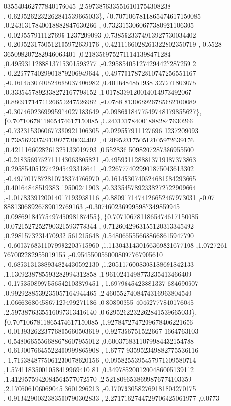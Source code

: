 \begin{DoxyCode}
      035540462777840176045 ,2.5973876335516101754308238 ,-0.6295262232262841539665033\},
\{0.7071067811865474617150085 ,0.2431317840018882847630266 ,-0.7323153060677380921106305 ,-0.029557911127696
      1237209093 ,0.7385623374913927730034402 ,-0.2095231750512105972639176 ,-0.4211166028261322802350719 ,-0.5528
      365098207282946063401 ,0.2183569752711141398471284 ,0.4959311288813715301593277 ,-0.295854051274294427287259
      2 ,-0.2267774029901879206949644 ,-0.4977017872810747256551167 ,-0.1614530740524685037406982 ,0.4016484851938
      327271803075 ,0.3335457892338272167798152 ,1.0178339120014014973492067 ,0.8809171474126650247526982 ,-0.0788
      813068926785682100089 ,-0.3074602369995974027183649 ,-0.0986918477549748179855627\},
\{0.7071067811865474617150085 ,0.2431317840018882847630266 ,-0.7323153060677380921106305 ,-0.029557911127696
      1237209093 ,0.7385623374913927730034402 ,-0.2095231750512105972639176 ,0.4211166028261326133019793 ,0.552836
      5098207287386955500 ,-0.2183569752711143063805821 ,-0.4959311288813719187373863 ,0.2958540512742946493318641
       ,-0.2267774029901875043613302 ,-0.4977017872810738374766970 ,-0.1614530740524681984293665 ,0.40164848519383
      19500241903 ,-0.3335457892338272722909664 ,-1.0178339120014017193938116 ,-0.8809171474126652467973031 ,-0.07
      88813068926789012769163 ,-0.3074602369995987349859945 ,0.0986918477549746098187455\},
\{0.7071067811865474617150085 ,0.0721527252790321593778344 ,-0.7126042963155120313345492 ,0.2981573231470932
      561215648 ,0.5480665556688668615947790 ,-0.6003768311079992203715960 ,1.1130431430166369821677108 ,1.0727261
      767002282955019155 ,-0.9545500560008097767905610 ,-0.6853131388934824430592130 ,1.2051176008308188691842133 
      ,1.1309238785593282994312858 ,1.9610241498773235413466409 ,-0.1753508997556542103879451 ,-1.6979645423881337
      684690607 ,0.9929288539235057164944465 ,2.4605527408474316963804540 ,1.0666368045867129499271186 ,0.80890355
      40462777840176045 ,2.5973876335516097313416140 ,0.6295262232262841539665033\},
\{0.7071067811865474617150085 ,0.9278472747209678406221656 ,-0.0139326223776805660503619 ,-0.927356751522667
      1664763103 ,-0.5480665556688678607955012 ,0.6003768311079984432154788 ,-0.6190076645522400999865908 ,-1.6777
      935952349882775536116 ,-1.7163848775061230078620156 ,-0.0958255395457971309580714 ,1.57411835001058419969410
      81 ,0.3497852001200486005139112 ,1.4129575942084564577072570 ,2.5218096538699876774103359 ,2.170606106069045
      3601296213 ,-0.1707930582769181804270175 ,-0.9134290032383500790302833 ,-2.2717162744729706425061977 ,0.0773

\end{DoxyCode}
